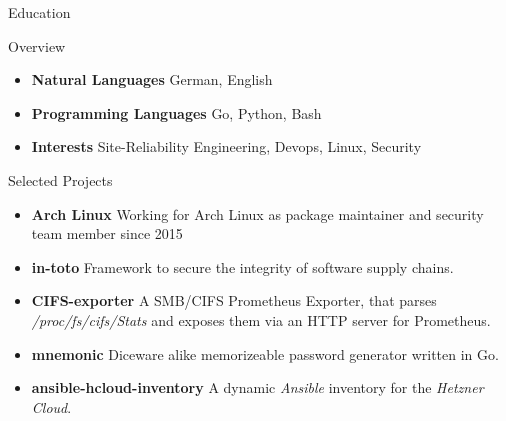 \documentclass[]{mcdowellcv}
\begin{document}
\begin{cvsection}{Education}
\begin{cvsection}{Overview}
\begin{cvsubsection}{}{}{}
\begin{itemize}
\item \textbf{Natural Languages} German, English
\item \textbf{Programming Languages} Go, Python, Bash
\item \textbf{Interests} Site-Reliability Engineering, Devops, Linux, Security
\end{itemize}
\end{cvsubsection}
\end{cvsection}

\end{cvsection}
\begin{cvsection}{Selected Projects}
\begin{cvsubsection}{}{}{}
\begin{itemize}
\item \textbf{Arch Linux} Working for Arch Linux as package maintainer and security team member since 2015
\item \textbf{in-toto} Framework to secure the integrity of software supply chains.
\item \textbf{CIFS-exporter} A SMB/CIFS Prometheus Exporter, that parses \textit{/proc/fs/cifs/Stats} and exposes them via an HTTP server for Prometheus.
\item \textbf{mnemonic} Diceware alike memorizeable password generator written in Go.
\item \textbf{ansible-hcloud-inventory} A dynamic \textit{Ansible} inventory for the \textit{Hetzner Cloud}.
\end{itemize}
\end{cvsubsection}
\end{cvsection}
\end{document}
